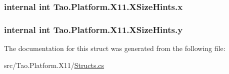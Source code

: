 \label{struct_tao_1_1_platform_1_1_x11_1_1_x_size_hints_a45cf869598855a38b546afa6e601f3a8}
\hypertarget{struct_tao_1_1_platform_1_1_x11_1_1_x_size_hints_ac5d067557c51f2bf324d1b9028f5eff2}{
\subsubsection[{x}]{\setlength{\rightskip}{0pt plus 5cm}internal int {\bf Tao.Platform.X11.XSizeHints.x}}}
\label{struct_tao_1_1_platform_1_1_x11_1_1_x_size_hints_ac5d067557c51f2bf324d1b9028f5eff2}
\hypertarget{struct_tao_1_1_platform_1_1_x11_1_1_x_size_hints_aa6934c8f66e612c9a70a49dbbd811d4b}{
\subsubsection[{y}]{\setlength{\rightskip}{0pt plus 5cm}internal int {\bf Tao.Platform.X11.XSizeHints.y}}}
\label{struct_tao_1_1_platform_1_1_x11_1_1_x_size_hints_aa6934c8f66e612c9a70a49dbbd811d4b}


The documentation for this struct was generated from the following file:\begin{DoxyCompactItemize}
\item 
src/Tao.Platform.X11/\hyperlink{_structs_8cs}{Structs.cs}\end{DoxyCompactItemize}
